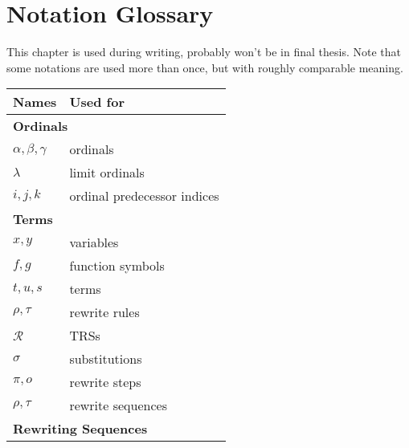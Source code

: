 \chapter*{Notation Glossary}

This chapter is used during writing, probably won't be in final thesis. Note
that some notations are used more than once, but with roughly comparable
meaning.

{\renewcommand{\arraystretch}{1.1}
\renewcommand{\tabcolsep}{10pt}
\begin{tabular}{p{150pt} p{175pt}}
Names & Used for\\
\hline
\multicolumn{2}{l}{\bf Ordinals}\\
$\alpha, \beta, \gamma$ & ordinals\\
$\lambda$ & limit ordinals\\
$i, j, k$ & ordinal predecessor indices\\
\multicolumn{2}{l}{\bf Terms}\\
$x, y$ & variables\\
$f, g$ & function symbols\\
$t, u, s$ & terms\\
$\rho, \tau$ & rewrite rules\\
$\mathcal{R}$ & TRSs\\
$\sigma$ & substitutions\\
$\pi, o$ & rewrite steps\\
$\rho, \tau$ & rewrite sequences\\
\multicolumn{2}{l}{\bf Rewriting Sequences}\\
\end{tabular}}

